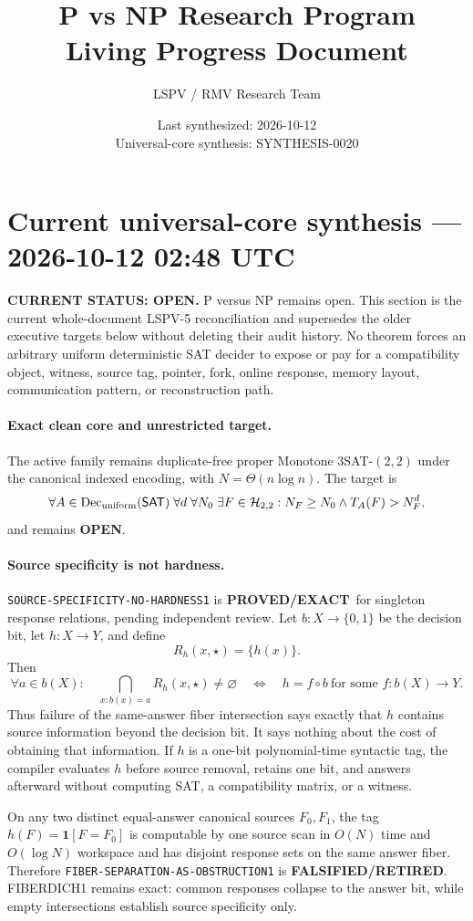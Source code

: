 \documentclass[11pt]{article}
\title{\bfseries P vs NP Research Program\\[0.25em]
\Large Living Progress Document}
\author{LSPV / RMV Research Team}
\date{Last synthesized: 2026-10-12\\ Universal-core synthesis: SYNTHESIS-0020}
\newcommand{\statusproved}{\textcolor{proved}{\textbf{PROVED/EXACT}}}
\newcommand{\statusopen}{\textcolor{openstatus}{\textbf{OPEN}}}
\newcommand{\statusretired}{\textcolor{retired}{\textbf{FALSIFIED/RETIRED}}}
\begin{document}
\section{Current universal-core synthesis --- 2026-10-12 02:48 UTC}

\begin{statusbox}
\textbf{CURRENT STATUS: OPEN.} P versus NP remains open.  This section is the
current whole-document LSPV-5 reconciliation and supersedes the older
executive targets below without deleting their audit history.  No theorem
forces an arbitrary uniform deterministic SAT decider to expose or pay for a
compatibility object, witness, source tag, pointer, fork, online response,
memory layout, communication pattern, or reconstruction path.
\end{statusbox}

\paragraph{Exact clean core and unrestricted target.}
The active family remains duplicate-free proper Monotone $3$SAT-$(2,2)$ under
the canonical indexed encoding, with $N=\Theta(n\log n)$.  The target is
\[
 \forall A\in\operatorname{Dec}_{\rm uniform}(\mathsf{SAT})\;
 \forall d\;\forall N_0\;\exists F\in\mathcal H_{2,2}:
 N_F\ge N_0\land T_A(F)>N_F^d,
\]
and remains \statusopen.

\paragraph{Source specificity is not hardness.}
\texttt{SOURCE-SPECIFICITY-NO-HARDNESS1} is \statusproved\ for singleton
response relations, pending independent review.  Let $b:X\to\{0,1\}$ be the
decision bit, let $h:X\to Y$, and define
\[
 R_h(x,\star)=\{h(x)\}.
\]
Then
\[
 \forall a\in b(X):\quad
 \bigcap_{x:b(x)=a}R_h(x,\star)\ne\varnothing
 \quad\Longleftrightarrow\quad
 h=f\circ b\ \text{for some }f:b(X)\to Y.
\]
Thus failure of the same-answer fiber intersection says exactly that $h$
contains source information beyond the decision bit.  It says nothing about
the cost of obtaining that information.  If $h$ is a one-bit polynomial-time
syntactic tag, the compiler evaluates $h$ before source removal, retains one
bit, and answers afterward without computing SAT, a compatibility matrix, or
a witness.

On any two distinct equal-answer canonical sources $F_0,F_1$, the tag
$h(F)=\mathbf1[F=F_0]$ is computable by one source scan in $O(N)$ time and
$O(\log N)$ workspace and has disjoint response sets on the same answer
fiber.  Therefore \texttt{FIBER-SEPARATION-AS-OBSTRUCTION1} is
\statusretired.  FIBERDICH1 remains exact: common responses collapse to the
answer bit, while empty intersections establish source specificity only.
\end{document}
